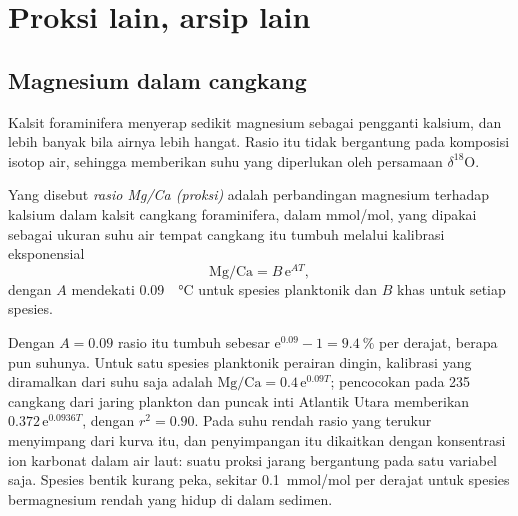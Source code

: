 \section{Proksi lain, arsip lain}\label{sec:b2:climate-proxies:others}

\subsection*{Magnesium dalam cangkang}

Kalsit foraminifera menyerap sedikit magnesium sebagai pengganti kalsium, dan lebih banyak bila
airnya lebih hangat. Rasio itu tidak bergantung pada komposisi isotop air, sehingga
memberikan suhu yang diperlukan oleh persamaan $\delta^{18}$O.

\begin{definition}\label{def:b2:climate-proxies:mgca}
Yang disebut \emph{rasio Mg/Ca (proksi)} adalah perbandingan magnesium terhadap kalsium dalam
kalsit cangkang foraminifera, dalam \unit{mmol/mol}, yang dipakai sebagai ukuran suhu
air tempat cangkang itu tumbuh melalui kalibrasi eksponensial
\[
  \text{Mg/Ca} = B\,\mathrm{e}^{A T},
\]
dengan $A$ mendekati \qty{0.09}{\per\celsius} untuk spesies planktonik dan $B$ khas untuk setiap spesies.
\end{definition}

Dengan $A = 0.09$ rasio itu tumbuh sebesar $\mathrm{e}^{0.09} - 1 = \qty{9.4}{\percent}$ per derajat,
berapa pun suhunya. Untuk satu spesies planktonik perairan dingin, kalibrasi yang diramalkan dari
suhu saja adalah $\text{Mg/Ca} = 0.4\,\mathrm{e}^{0.09T}$; pencocokan pada 235 cangkang dari jaring
plankton dan puncak inti Atlantik Utara memberikan $0.372\,\mathrm{e}^{0.0936T}$, dengan $r^2 = 0.90$.
Pada suhu rendah rasio yang terukur menyimpang dari kurva itu, dan penyimpangan itu dikaitkan dengan
konsentrasi ion karbonat dalam air laut: suatu proksi jarang bergantung pada satu variabel saja.
Spesies bentik kurang peka, sekitar \qty{0.1}{mmol/mol} per derajat untuk spesies
bermagnesium rendah yang hidup di dalam sedimen.

